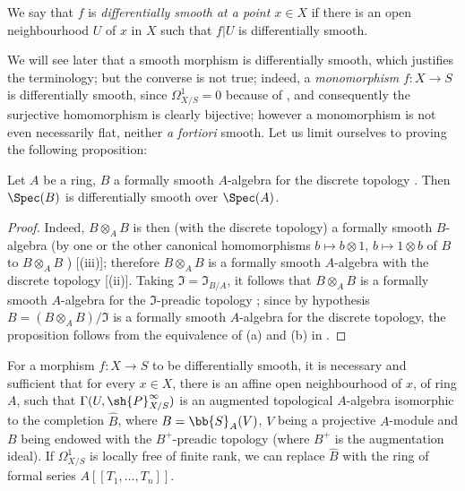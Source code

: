 We say that $f$ is \emph{differentially smooth at a point $x \in X$} if there is an open neighbourhood $U$ of $x$ in $X$ such that $f|U$ is differentially smooth.

We will see later  that a smooth morphism is differentially smooth, which justifies the terminology;
but the converse is not true;
indeed, a \emph{monomorphism} $f:X \to S$ is differentially smooth, since $\Omega^1_{X/S} = 0$ because of , and consequently the surjective homomorphism  is clearly bijective;
however a monomorphism is not even necessarily flat, neither \textit{a fortiori} smooth. 
Let us limit ourselves to proving the following proposition:

\begin{proposition}[16.10.2]
\label{IV.16.10.2}
Let $A$ be a ring, $B$ a formally smooth $A$-algebra for the discrete topology .
Then $\Spec(B)$ is differentially smooth over $\Spec(A)$.
\end{proposition}

\begin{proof}
Indeed, $B \otimes_A B$ is then (with the discrete topology) a formally smooth $B$-algebra (by one or the other canonical homomorphisms $b \mapsto b \otimes 1$, $b \mapsto 1 \otimes b$ of $B$
to $B \otimes_A B$
) [(iii)];
therefore $B \otimes_A B$ is a formally smooth $A$-algebra with the discrete topology [(ii)].
Taking $\mathfrak{I} = \mathfrak{I}_{B/A}$, it follows that $B \otimes_A B$ is a formally smooth $A$-algebra for the $\mathfrak{I}$-preadic topology ;
since by hypothesis $B = (B \otimes_A B)/\mathfrak{I}$ is a formally smooth $A$-algebra for the discrete topology, the proposition follows from the equivalence of (a) and (b) in .
\end{proof}

\begin{proposition}[16.10.3]
\label{IV.16.10.3}
For a morphism $f:X \to S$ to be differentially smooth, it is necessary and sufficient that for every $x \in X$, there is an affine open neighbourhood of $x$, of ring $A$, such that $\Gamma(U, \sh{P}_{X/S}^\infty)$ is an augmented topological $A$-algebra isomorphic to the completion $\widehat{B}$, where $B = \bb{S}_A(V)$, $V$ being a projective $A$-module and $B$ being endowed with the $B^+$-preadic topology (where $B^+$ is the augmentation ideal).
If $\Omega_{X/S}^1$ is locally free of finite rank, we can replace $\widehat{B}$ with the ring of formal series $A[[T_1, \dots, T_n]]$.
\end{proposition}

